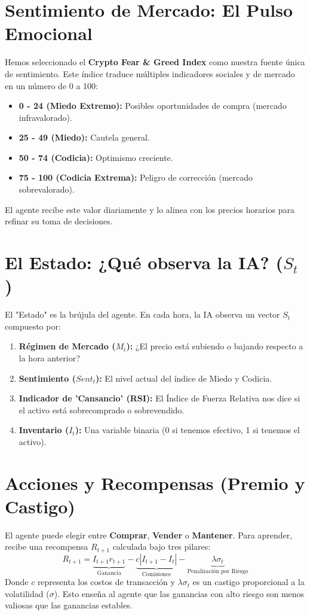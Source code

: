 \documentclass[12pt,a4paper]{article}
\begin{document}
\section{Sentimiento de Mercado: El Pulso Emocional}
Hemos seleccionado el \textbf{Crypto Fear \& Greed Index} como nuestra fuente única de sentimiento. Este índice traduce múltiples indicadores sociales y de mercado en un número de 0 a 100:
\begin{itemize}
    \item \textbf{0 - 24 (Miedo Extremo):} Posibles oportunidades de compra (mercado infravalorado).
    \item \textbf{25 - 49 (Miedo):} Cautela general.
    \item \textbf{50 - 74 (Codicia):} Optimismo creciente.
    \item \textbf{75 - 100 (Codicia Extrema):} Peligro de corrección (mercado sobrevalorado).
\end{itemize}
El agente recibe este valor diariamente y lo alinea con los precios horarios para refinar su toma de decisiones.

\section{El Estado: ¿Qué observa la IA? ($S_t$)}
El "Estado" es la brújula del agente. En cada hora, la IA observa un vector $S_t$ compuesto por:
\begin{enumerate}
    \item \textbf{Régimen de Mercado ($M_t$):} ¿El precio está subiendo o bajando respecto a la hora anterior?
    \item \textbf{Sentimiento ($Sent_t$):} El nivel actual del índice de Miedo y Codicia.
    \item \textbf{Indicador de 'Cansancio' (RSI):} El Índice de Fuerza Relativa nos dice si el activo está sobrecomprado o sobrevendido.
    \item \textbf{Inventario ($I_t$):} Una variable binaria (0 si tenemos efectivo, 1 si tenemos el activo).
\end{enumerate}

\section{Acciones y Recompensas (Premio y Castigo)}
El agente puede elegir entre \textbf{Comprar}, \textbf{Vender} o \textbf{Mantener}. Para aprender, recibe una recompensa $R_{t+1}$ calculada bajo tres pilares:
\begin{equation}
    R_{t+1} = \underbrace{I_{t+1}r_{t+1}}_{\text{Ganancia}} - \underbrace{c|I_{t+1} - I_t|}_{\text{Comisiones}} - \underbrace{\lambda \sigma_t}_{\text{Penalización por Riesgo}}
\end{equation}
Donde $c$ representa los costos de transacción y $\lambda \sigma_t$ es un castigo proporcional a la volatilidad ($\sigma$). Esto enseña al agente que las ganancias con alto riesgo son menos valiosas que las ganancias estables.
\end{document}
